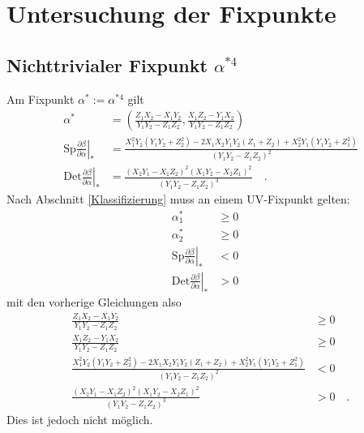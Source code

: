 \documentclass{article}
\newcommand{\Sp}{ \text{Sp} \frac{\partial \beta}{\partial \alpha}}
\newcommand{\Det}{ \text{Det} \frac{\partial \beta}{\partial \alpha}}
\begin{document}
\clearpage
\section{Untersuchung der Fixpunkte}

	\subsection{Nichttrivialer Fixpunkt $\alpha^{*4}$}
 		Am Fixpunkt $\alpha^*:=\alpha^{*4}$ gilt
 		\begin{align}
 		\alpha^*&=\left(\frac{Z_1X_2-X_1Y_2}{Y_1Y_2-Z_1Z_2},\frac{X_1Z_2-Y_1X_2} 
 					{Y_1Y_2-Z_1Z_2}\right)\\
 		\left.\Sp \right|_*&=\frac{ X_1^2Y_2(Y_1Y_2+Z_2^2)
				-2X_1X_2Y_1Y_2(Z_1+Z_2)
				 +X_2^2Y_1(Y_1Y_2+Z_1^2) }{
				\left( Y_1Y_2-Z_1Z_2 \right)^{2}} \\
		\left.\Det \right|_*&=\frac{(X_2Y_1-X_1Z_2)^2(X_1Y_2-X_2Z_1)^2}{
				(Y_1Y_2-Z_1Z_2)^{3}} \quad .
		\end{align} 		 
 		Nach Abschnitt \ref{Klassifizierung} muss an einem UV-Fixpunkt 
 		gelten:
 		\begin{align}
 		\alpha_1^* &\geq 0 \\
 		\alpha_2^* &\geq 0 \\
 		\left.\Sp \right|_*& < 0 \\
 		\left.\Det \right|_*& > 0 \quad	
 		\end{align}
 		mit den vorherige Gleichungen also
 		\begin{align}
 		\frac{Z_1X_2-X_1Y_2}{Y_1Y_2-Z_1Z_2} &\geq 0 \label{I}\\
 		\frac{X_1Z_2-Y_1X_2} {Y_1Y_2-Z_1Z_2} &\geq 0 \label{II}\\
 		\frac{ X_1^2Y_2(Y_1Y_2+Z_2^2)
				-2X_1X_2Y_1Y_2(Z_1+Z_2)  +
				X_2^2Y_1(Y_1Y_2+Z_1^2)}{
				 (Y_1Y_2-Z_1Z_2)^2}&< 0 \label{III} \\
 		\frac{(X_2Y_1-X_1Z_2)^2(X_1Y_2-X_2Z_1)^2}
				{(Y_1Y_2-Z_1Z_2)^{3}}&> 0 	\label{IV} \quad .
 		\end{align}
 		Dies ist jedoch nicht möglich.
\end{document}
